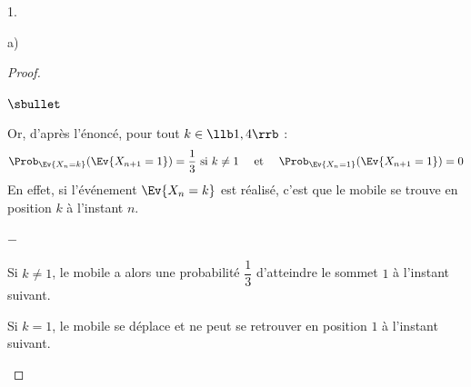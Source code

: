 \documentclass[11pt]{article}%
\begin{document}
\begin{noliste}{1.}
\begin{noliste}{a)}
\begin{proof}
\begin{noliste}{$\sbullet$}
        \newpage


      \item Or, d'après l'énoncé, pour tout $k \in \llb 1, 4\rrb$ :
        \[
        \Prob_{\Ev{X_n = k}}(\Ev{X_{n+1} = 1}) = \dfrac{1}{3} \text{
          si $k \neq 1$} \quad \text{ et } \quad \Prob_{\Ev{X_n =
            1}}(\Ev{X_{n+1} = 1}) = 0
        \]
        En effet, si l'événement $\Ev{X_n = k}$ est réalisé, c'est que
        le mobile se trouve en position $k$ à l'instant $n$.
        \begin{noliste}{$-$}
        \item Si $k \neq 1$, le mobile a alors une probabilité
          $\dfrac{1}{3}$ d'atteindre le sommet $1$ à l'instant
          suivant.
        \item Si $k = 1$, le mobile se déplace et ne peut se retrouver
          en position $1$ à l'instant suivant.
        \end{noliste}
        

\end{noliste}
\end{proof}
\end{noliste}
\end{noliste}
\end{document}
